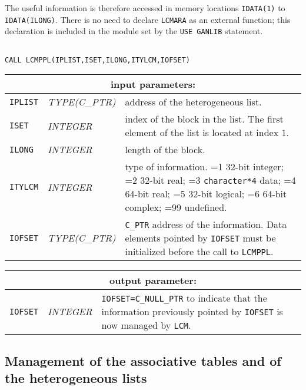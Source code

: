 The useful information is therefore accessed in memory locations {\tt IDATA(1)} to {\tt IDATA(ILONG)}. There is no need to 
declare {\tt LCMARA} as an external function; this declaration is included in the module set by the {\tt USE GANLIB} statement.
 
\begin{verbatim}

CALL LCMPPL(IPLIST,ISET,ILONG,ITYLCM,IOFSET)
\end{verbatim}

\noindent
\begin{tabular}{|p{1.5cm}|p{3cm}|p{10cm}|}
\hline
\multicolumn{3}{|c|}{\bf input parameters:} \\
\hline
{\tt IPLIST} & {\it TYPE(C\_PTR)} & address of the heterogeneous list. \\
\hline
{\tt ISET} & {\it INTEGER} & index of the block in the list.
The first element of the list is located at index $1$. \\
\hline
{\tt ILONG} & {\it INTEGER} & length of the block. \\
\hline
{\tt ITYLCM} & {\it INTEGER} & type of information. =1 32-bit integer; 
                                    =2 32-bit real; =3 {\tt character*4} data; 
				    =4 64-bit real; =5 32-bit logical; =6 64-bit complex;
				    =99 undefined. \\
\hline
{\tt IOFSET} &  {\it TYPE(C\_PTR)} & {\tt C\_PTR} address of the information. Data elements pointed
by {\tt IOFSET} must be initialized before the call to {\tt LCMPPL}. \\
\hline
\end{tabular}

\vskip 0.8cm

\noindent
\begin{tabular}{|p{1.5cm}|p{3cm}|p{10cm}|}
\hline
\multicolumn{3}{|c|}{\bf output parameter:} \\
\hline
{\tt IOFSET} & {\it INTEGER} & {\tt IOFSET=C\_NULL\_PTR} to indicate that the information previously pointed by
                                     {\tt IOFSET} is now managed by {\tt LCM}. \\
\hline
\end{tabular}

\vskip 0.8cm

\subsection{Management of the associative tables and of the heterogeneous lists}

